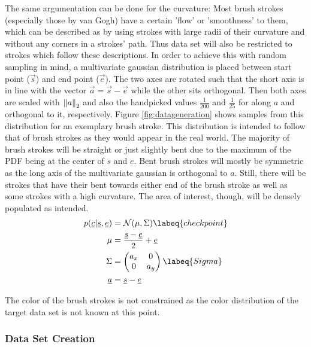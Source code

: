 The same argumentation can be done for the curvature:
Most brush strokes (especially those by van Gogh) have a certain 'flow' or 'smoothness'
to them, which can be described as by using strokes with large radii of their curvature
and without any corners in a strokes' path.
Thus data set will also be restricted to strokes which follow these descriptions.
In order to achieve this with random sampling in mind, a multivariate gaussian distribution
is placed between start point ($\vec{s}$) and end point ($\vec{e}$).
The two axes are rotated such that the short axis is in line with the vector
$\vec{a} = \vec{s} - \vec{e}$ while the other sits orthogonal.
Then both axes are scaled with $\left\lVert a\right\rVert_2$ and also the handpicked values $\frac{1}{200}$
and $\frac{1}{25}$ for along $a$ and orthogonal to it, respectively.
Figure \ref{fig:datageneration} shows samples from this distribution for an exemplary
brush stroke.
This distribution is intended to follow that of brush strokes as they would appear
in the real world.
The majority of brush strokes will be straight or just slightly bent due to the maximum
of the PDF being at the center of $s$ and $e$.
Bent brush strokes will mostly be symmetric as the long axis of the multivariate gaussian
is orthogonal to $a$.
Still, there will be strokes that have their bent towards either end of the brush stroke
as well as some strokes with a high curvature.
The area of interest, though, will be densely populated as intended.
\begin{align}
    p(\vec{c}| \vec{s}, \vec{e}) & = \mathcal{N}(\mu, \Sigma) \labeq{checkpoint} \\
    \mu & = \frac{\vec{s} - \vec{e}}{2} + \vec{e} \\
    \Sigma & =
        \begin{pmatrix}
            a_x & 0 \\
            0 & a_y
        \end{pmatrix} \labeq{Sigma}\\
    \vec{a} & = \vec{s} - \vec{e}
\end{align}

The color of the brush strokes is not constrained as the color distribution of the
target data set is not known at this point. 



\subsubsection{Data Set Creation}

